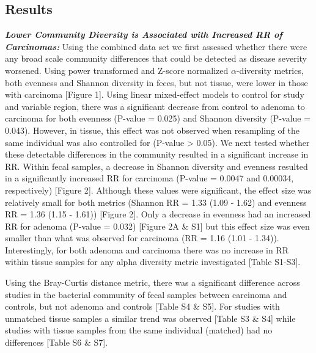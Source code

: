 \documentclass[12pt,]{article}
\begin{document}
\newpage

\subsection{Results}\label{results}

\textbf{\emph{Lower Community Diversity is Associated with Increased RR
of Carcinomas:}} Using the combined data set we first assessed whether
there were any broad scale community differences that could be detected
as disease severity worsened. Using power transformed and Z-score
normalized \(\alpha\)-diversity metrics, both evenness and Shannon
diversity in feces, but not tissue, were lower in those with carcinoma
{[}Figure 1{]}. Using linear mixed-effect models to control for study
and variable region, there was a significant decrease from control to
adenoma to carcinoma for both evenness (P-value = 0.025) and Shannon
diversity (P-value = 0.043). However, in tissue, this effect was not
observed when resampling of the same individual was also controlled for
(P-value \textgreater{} 0.05). We next tested whether these detectable
differences in the community resulted in a significant increase in RR.
Within fecal samples, a decrease in Shannon diversity and evenness
resulted in a significantly increased RR for carcinoma (P-value = 0.0047
and 0.00034, respectively) {[}Figure 2{]}. Although these values were
significant, the effect size was relatively small for both metrics
(Shannon RR = 1.33 (1.09 - 1.62) and evenness RR = 1.36 (1.15 - 1.61))
{[}Figure 2{]}. Only a decrease in evenness had an increased RR for
adenoma (P-value = 0.032) {[}Figure 2A \& S1{]} but this effect size was
even smaller than what was observed for carcinoma (RR = 1.16 (1.01 -
1.34)). Interestingly, for both adenoma and carcinoma there was no
increase in RR within tissue samples for any alpha diversity metric
investigated {[}Table S1-S3{]}.

Using the Bray-Curtis distance metric, there was a significant
difference across studies in the bacterial community of fecal samples
between carcinoma and controls, but not adenoma and controls {[}Table S4
\& S5{]}. For studies with unmatched tissue samples a similar trend was
observed {[}Table S3 \& S4{]} while studies with tissue samples from the
same individual (matched) had no differences {[}Table S6 \& S7{]}.
\end{document}
